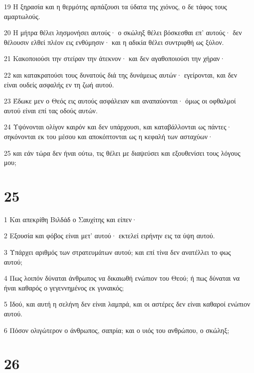 \par 19 Η ξηρασία και η θερμότης αρπάζουσι τα ύδατα της χιόνος, ο δε τάφος τους αμαρτωλούς.
\par 20 Η μήτρα θέλει λησμονήσει αυτούς· ο σκώληξ θέλει βόσκεσθαι επ' αυτούς· δεν θέλουσιν ελθεί πλέον εις ενθύμησιν· και η αδικία θέλει συντριφθή ως ξύλον.
\par 21 Κακοποιούσι την στείραν την άτεκνον· και δεν αγαθοποιούσι την χήραν·
\par 22 και κατακρατούσι τους δυνατούς διά της δυνάμεως αυτών· εγείρονται, και δεν είναι ουδείς ασφαλής εν τη ζωή αυτού.
\par 23 Έδωκε μεν ο Θεός εις αυτούς ασφάλειαν και αναπαύονται· όμως οι οφθαλμοί αυτού είναι επί τας οδούς αυτών.
\par 24 Υψόνονται ολίγον καιρόν και δεν υπάρχουσι, και καταβάλλονται ως πάντες· σηκόνονται εκ του μέσου και αποκόπτονται ως η κεφαλή των ασταχύων·
\par 25 και εάν τώρα δεν ήναι ούτω, τις θέλει με διαψεύσει και εξουθενίσει τους λόγους μου;

\chapter{25}

\par 1 Και απεκρίθη Βιλδάδ ο Σαυχίτης και είπεν·
\par 2 Εξουσία και φόβος είναι μετ' αυτού· εκτελεί ειρήνην εις τα ύψη αυτού.
\par 3 Υπάρχει αριθμός των στρατευμάτων αυτού; και επί τίνα δεν ανατέλλει το φως αυτού;
\par 4 Πως λοιπόν δύναται άνθρωπος να δικαιωθή ενώπιον του Θεού; ή πως δύναται να ήναι καθαρός ο γεγεννημένος εκ γυναικός;
\par 5 Ιδού, και αυτή η σελήνη δεν είναι λαμπρά, και οι αστέρες δεν είναι καθαροί ενώπιον αυτού.
\par 6 Πόσον ολιγώτερον ο άνθρωπος, σαπρία; και ο υιός του ανθρώπου, ο σκώληξ;

\chapter{26}

